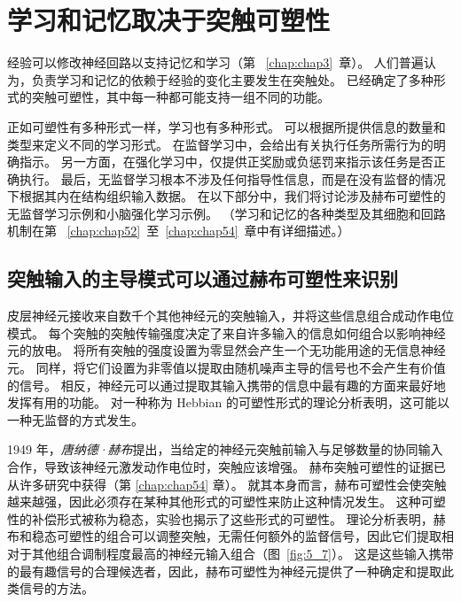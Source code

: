 \section{学习和记忆取决于突触可塑性}

经验可以修改神经回路以支持记忆和学习（第 ~\ref{chap:chap3}~章）。 
人们普遍认为，负责学习和记忆的依赖于经验的变化主要发生在突触处。 
已经确定了多种形式的突触可塑性，其中每一种都可能支持一组不同的功能。


正如可塑性有多种形式一样，学习也有多种形式。
可以根据所提供信息的数量和类型来定义不同的学习形式。
在监督学习中，会给出有关执行任务所需行为的明确指示。
另一方面，在强化学习中，仅提供正奖励或负惩罚来指示该任务是否正确执行。
最后，无监督学习根本不涉及任何指导性信息，而是在没有监督的情况下根据其内在结构组织输入数据。
在以下部分中，我们将讨论涉及赫布可塑性的无监督学习示例和小脑强化学习示例。
（学习和记忆的各种类型及其细胞和回路机制在第 ~\ref{chap:chap52}~至~\ref{chap:chap54}~章中有详细描述。）



\subsection{突触输入的主导模式可以通过赫布可塑性来识别}

皮层神经元接收来自数千个其他神经元的突触输入，并将这些信息组合成动作电位模式。
每个突触的突触传输强度决定了来自许多输入的信息如何组合以影响神经元的放电。
将所有突触的强度设置为零显然会产生一个无功能用途的无信息神经元。
同样，将它们设置为非零值以提取由随机噪声主导的信号也不会产生有价值的信号。
相反，神经元可以通过提取其输入携带的信息中最有趣的方面来最好地发挥有用的功能。
对一种称为 Hebbian 的可塑性形式的理论分析表明，这可能以一种无监督的方式发生。


1949 年，\textit{唐纳德·赫布}提出，当给定的神经元突触前输入与足够数量的协同输入合作，导致该神经元激发动作电位时，突触应该增强。 
赫布突触可塑性的证据已从许多研究中获得（第 \ref{chap:chap54} 章）。 
就其本身而言，赫布可塑性会使突触越来越强，因此必须存在某种其他形式的可塑性来防止这种情况发生。 
这种可塑性的补偿形式被称为稳态，实验也揭示了这些形式的可塑性。 
理论分析表明，赫布和稳态可塑性的组合可以调整突触，无需任何额外的监督信号，因此它们提取相对于其他组合调制程度最高的神经元输入组合（图~\ref{fig:5_7}）。 
这是这些输入携带的最有趣信号的合理候选者，因此，赫布可塑性为神经元提供了一种确定和提取此类信号的方法。

